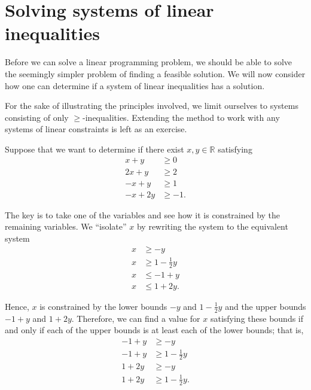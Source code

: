 %

\section{Solving systems of linear
inequalities}\label{solving-systems-of-linear-inequalities}

Before we can solve a linear programming problem, we should be able to
solve the seemingly simpler problem of finding a feasible solution. We
will now consider how one can determine if a system of linear
inequalities has a solution.

For the sake of illustrating the principles involved, we limit ourselves
to systems consisting of only \(\geq\)-inequalities. Extending the
method to work with any systems of linear constraints is left as an
exercise.

Suppose that we want to determine if there exist \(x,y\in\mathbb{R}\)
satisfying
\begin{align*}
x + y & \geq 0 \\
2x + y & \geq 2 \\
-x + y  & \geq 1 \\
-x + 2y & \geq -1.
\end{align*}

The key is to take one of the variables and see how it is constrained by
the remaining variables. We ``isolate'' \(x\) by rewriting the system to
the equivalent system
\begin{align*}
x & \geq -y  \\
x & \geq 1 - \frac{1}{2}y \\
x & \leq -1 +y \\
x & \leq 1 + 2y.
\end{align*}

Hence, \(x\) is constrained by the lower bounds \(-y\) and
\(1 - \frac{1}{2}y\) and the upper bounds \(-1 +y\) and \(1 + 2y\).
Therefore, we can find a value for \(x\) satisfying these bounds if and
only if each of the upper bounds is at least each of the lower bounds;
that is,
\begin{align*}
-1 + y & \geq -y \\
-1 + y & \geq 1 - \frac{1}{2}y \\
1 + 2y & \geq -y \\
1 + 2y & \geq 1 - \frac{1}{2}y.
\end{align*}

